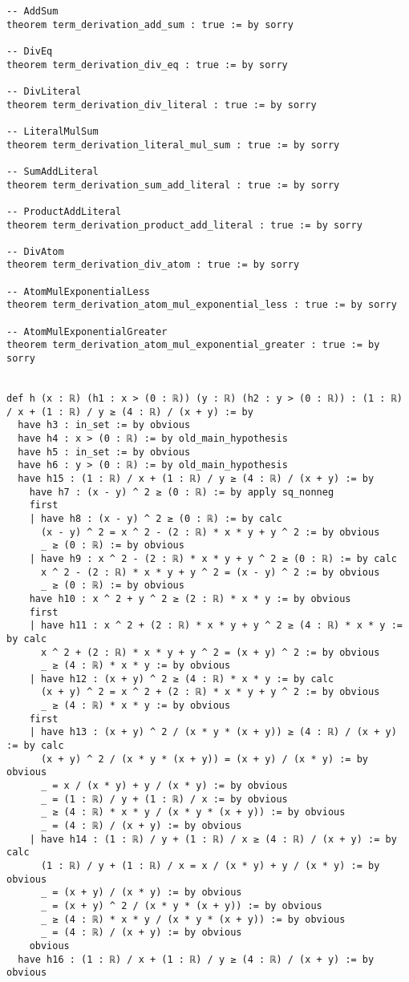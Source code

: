 \documentclass{article}
\begin{document}
\begin{tcolorbox}[colback=white!10, width=\linewidth]
\begin{lstlisting}[language=Lean4]
-- AddSum
theorem term_derivation_add_sum : true := by sorry

-- DivEq
theorem term_derivation_div_eq : true := by sorry

-- DivLiteral
theorem term_derivation_div_literal : true := by sorry

-- LiteralMulSum
theorem term_derivation_literal_mul_sum : true := by sorry

-- SumAddLiteral
theorem term_derivation_sum_add_literal : true := by sorry

-- ProductAddLiteral
theorem term_derivation_product_add_literal : true := by sorry

-- DivAtom
theorem term_derivation_div_atom : true := by sorry

-- AtomMulExponentialLess
theorem term_derivation_atom_mul_exponential_less : true := by sorry

-- AtomMulExponentialGreater
theorem term_derivation_atom_mul_exponential_greater : true := by sorry


def h (x : ℝ) (h1 : x > (0 : ℝ)) (y : ℝ) (h2 : y > (0 : ℝ)) : (1 : ℝ) / x + (1 : ℝ) / y ≥ (4 : ℝ) / (x + y) := by
  have h3 : in_set := by obvious
  have h4 : x > (0 : ℝ) := by old_main_hypothesis
  have h5 : in_set := by obvious
  have h6 : y > (0 : ℝ) := by old_main_hypothesis
  have h15 : (1 : ℝ) / x + (1 : ℝ) / y ≥ (4 : ℝ) / (x + y) := by
    have h7 : (x - y) ^ 2 ≥ (0 : ℝ) := by apply sq_nonneg
    first
    | have h8 : (x - y) ^ 2 ≥ (0 : ℝ) := by calc
      (x - y) ^ 2 = x ^ 2 - (2 : ℝ) * x * y + y ^ 2 := by obvious
      _ ≥ (0 : ℝ) := by obvious
    | have h9 : x ^ 2 - (2 : ℝ) * x * y + y ^ 2 ≥ (0 : ℝ) := by calc
      x ^ 2 - (2 : ℝ) * x * y + y ^ 2 = (x - y) ^ 2 := by obvious
      _ ≥ (0 : ℝ) := by obvious
    have h10 : x ^ 2 + y ^ 2 ≥ (2 : ℝ) * x * y := by obvious
    first
    | have h11 : x ^ 2 + (2 : ℝ) * x * y + y ^ 2 ≥ (4 : ℝ) * x * y := by calc
      x ^ 2 + (2 : ℝ) * x * y + y ^ 2 = (x + y) ^ 2 := by obvious
      _ ≥ (4 : ℝ) * x * y := by obvious
    | have h12 : (x + y) ^ 2 ≥ (4 : ℝ) * x * y := by calc
      (x + y) ^ 2 = x ^ 2 + (2 : ℝ) * x * y + y ^ 2 := by obvious
      _ ≥ (4 : ℝ) * x * y := by obvious
    first
    | have h13 : (x + y) ^ 2 / (x * y * (x + y)) ≥ (4 : ℝ) / (x + y) := by calc
      (x + y) ^ 2 / (x * y * (x + y)) = (x + y) / (x * y) := by obvious
      _ = x / (x * y) + y / (x * y) := by obvious
      _ = (1 : ℝ) / y + (1 : ℝ) / x := by obvious
      _ ≥ (4 : ℝ) * x * y / (x * y * (x + y)) := by obvious
      _ = (4 : ℝ) / (x + y) := by obvious
    | have h14 : (1 : ℝ) / y + (1 : ℝ) / x ≥ (4 : ℝ) / (x + y) := by calc
      (1 : ℝ) / y + (1 : ℝ) / x = x / (x * y) + y / (x * y) := by obvious
      _ = (x + y) / (x * y) := by obvious
      _ = (x + y) ^ 2 / (x * y * (x + y)) := by obvious
      _ ≥ (4 : ℝ) * x * y / (x * y * (x + y)) := by obvious
      _ = (4 : ℝ) / (x + y) := by obvious
    obvious
  have h16 : (1 : ℝ) / x + (1 : ℝ) / y ≥ (4 : ℝ) / (x + y) := by obvious

\end{lstlisting}
\end{tcolorbox}
\end{document}
